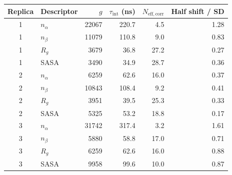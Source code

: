 \begin{tabular}{@{}clrrrr@{}}\toprule
Replica & Descriptor & $g$ & $\tau_{\mathrm{int}}$ (ns) & $N_{\mathrm{eff,corr}}$ & Half shift / SD\\\midrule
1 & $n_\alpha$ & \num{22067} & 220.7 & 4.5 & 1.28 \\
1 & $n_\beta$ & \num{11079} & 110.8 & 9.0 & 0.83 \\
1 & $R_g$ & \num{3679} & 36.8 & 27.2 & 0.27 \\
1 & SASA & \num{3490} & 34.9 & 28.7 & 0.36 \\
2 & $n_\alpha$ & \num{6259} & 62.6 & 16.0 & 0.37 \\
2 & $n_\beta$ & \num{10843} & 108.4 & 9.2 & 0.41 \\
2 & $R_g$ & \num{3951} & 39.5 & 25.3 & 0.33 \\
2 & SASA & \num{5325} & 53.2 & 18.8 & 0.17 \\
3 & $n_\alpha$ & \num{31742} & 317.4 & 3.2 & 1.61 \\
3 & $n_\beta$ & \num{5880} & 58.8 & 17.0 & 0.71 \\
3 & $R_g$ & \num{6259} & 62.6 & 16.0 & 0.88 \\
3 & SASA & \num{9958} & 99.6 & 10.0 & 0.87 \\
\bottomrule\end{tabular}
